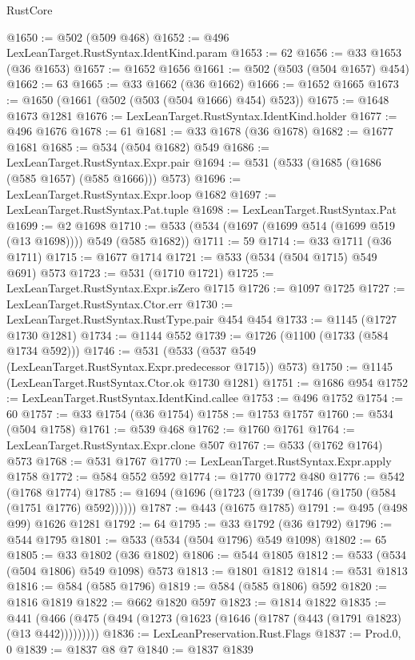 \begin{lexlean}{RustCore}
\begin{coremodule}
@1650 := @502 (@509 @468)
@1652 := @496 LexLeanTarget.RustSyntax.IdentKind.param
@1653 := 62
@1656 := @33 @1653 (@36 @1653)
@1657 := @1652 @1656
@1661 := @502 (@503 (@504 @1657) @454)
@1662 := 63
@1665 := @33 @1662 (@36 @1662)
@1666 := @1652 @1665
@1673 := @1650 (@1661 (@502 (@503 (@504 @1666) @454) @523))
@1675 := @1648 @1673 @1281
@1676 := LexLeanTarget.RustSyntax.IdentKind.holder
@1677 := @496 @1676
@1678 := 61
@1681 := @33 @1678 (@36 @1678)
@1682 := @1677 @1681
@1685 := @534 (@504 @1682) @549
@1686 := LexLeanTarget.RustSyntax.Expr.pair
@1694 := @531 (@533 (@1685 (@1686 (@585 @1657) (@585 @1666))) @573)
@1696 := LexLeanTarget.RustSyntax.Expr.loop @1682
@1697 := LexLeanTarget.RustSyntax.Pat.tuple
@1698 := LexLeanTarget.RustSyntax.Pat
@1699 := @2 @1698
@1710 := @533 (@534 (@1697 (@1699 @514 (@1699 @519 (@13 @1698)))) @549 (@585 @1682))
@1711 := 59
@1714 := @33 @1711 (@36 @1711)
@1715 := @1677 @1714
@1721 := @533 (@534 (@504 @1715) @549 @691) @573
@1723 := @531 (@1710 @1721)
@1725 := LexLeanTarget.RustSyntax.Expr.isZero @1715
@1726 := @1097 @1725
@1727 := LexLeanTarget.RustSyntax.Ctor.err
@1730 := LexLeanTarget.RustSyntax.RustType.pair @454 @454
@1733 := @1145 (@1727 @1730 @1281)
@1734 := @1144 @552
@1739 := @1726 (@1100 (@1733 (@584 @1734 @592)))
@1746 := @531 (@533 (@537 @549 (LexLeanTarget.RustSyntax.Expr.predecessor @1715)) @573)
@1750 := @1145 (LexLeanTarget.RustSyntax.Ctor.ok @1730 @1281)
@1751 := @1686 @954
@1752 := LexLeanTarget.RustSyntax.IdentKind.callee
@1753 := @496 @1752
@1754 := 60
@1757 := @33 @1754 (@36 @1754)
@1758 := @1753 @1757
@1760 := @534 (@504 @1758)
@1761 := @539 @468
@1762 := @1760 @1761
@1764 := LexLeanTarget.RustSyntax.Expr.clone @507
@1767 := @533 (@1762 @1764) @573
@1768 := @531 @1767
@1770 := LexLeanTarget.RustSyntax.Expr.apply @1758
@1772 := @584 @552 @592
@1774 := @1770 @1772 @480
@1776 := @542 (@1768 @1774)
@1785 := @1694 (@1696 (@1723 (@1739 (@1746 (@1750 (@584 (@1751 @1776) @592))))))
@1787 := @443 (@1675 @1785)
@1791 := @495 (@498 @99) @1626 @1281
@1792 := 64
@1795 := @33 @1792 (@36 @1792)
@1796 := @544 @1795
@1801 := @533 (@534 (@504 @1796) @549 @1098)
@1802 := 65
@1805 := @33 @1802 (@36 @1802)
@1806 := @544 @1805
@1812 := @533 (@534 (@504 @1806) @549 @1098) @573
@1813 := @1801 @1812
@1814 := @531 @1813
@1816 := @584 (@585 @1796)
@1819 := @584 (@585 @1806) @592
@1820 := @1816 @1819
@1822 := @662 @1820 @597
@1823 := @1814 @1822
@1835 := @441 (@466 (@475 (@494 (@1273 (@1623 (@1646 (@1787 (@443 (@1791 @1823) (@13 @442)))))))))
@1836 := LexLeanPreservation.Rust.Flags
@1837 := Prod.{0, 0}
@1839 := @1837 @8 @7
@1840 := @1837 @1839

\end{coremodule}
\end{lexlean}
